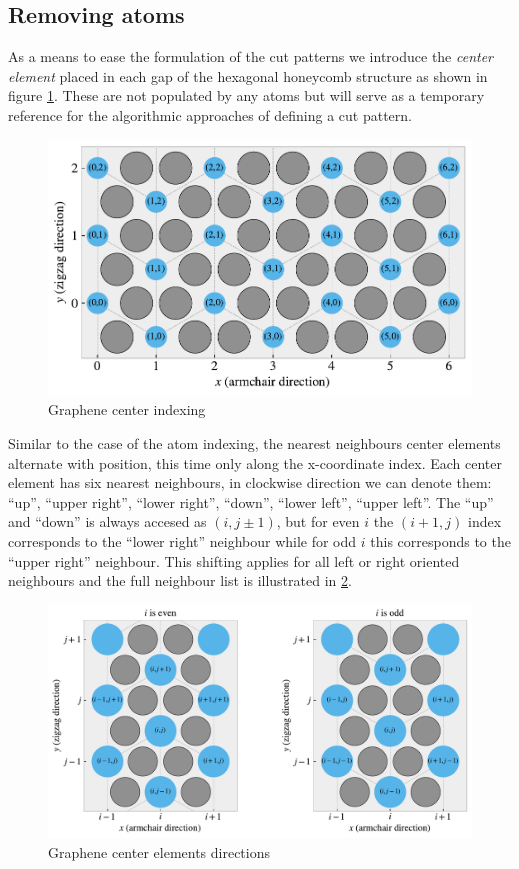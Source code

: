 \subsection{Removing atoms}
As a means to ease the formulation of the cut patterns we introduce the \textit{center element} placed in each gap of the hexagonal honeycomb structure as shown in figure \cref{fig:center_indexing}. These are not populated by any atoms but will serve as a temporary reference for the algorithmic approaches of defining a cut pattern.

\begin{figure}[H]
  \centering
  \includegraphics[width=0.7\linewidth]{figures/system/center_indexing.pdf}
  \caption{Graphene center indexing}
  \label{fig:center_indexing}
\end{figure}

Similar to the case of the atom indexing, the nearest neighbours center elements alternate with position, this time only along the x-coordinate index. Each center element has six nearest neighbours, in clockwise
direction we can denote them: ``up'', ``upper right'', ``lower right'',
``down'', ``lower left'', ``upper left''. The ``up'' and ``down'' is always
accesed as $(i,j\pm 1)$, but for even $i$ the $(i+1,j)$ index corresponds to the
``lower right'' neighbour while for odd $i$ this corresponds to the ``upper
right'' neighbour. This shifting applies for all left or right oriented neighbours and the full neighbour list is illustrated in \cref{fig:center_directions}. 


\begin{figure}[H]
  \centering
  \includegraphics[width=0.7\linewidth]{figures/system/center_directions.pdf}
  \caption{Graphene center elements directions}
  \label{fig:center_directions}
\end{figure}

